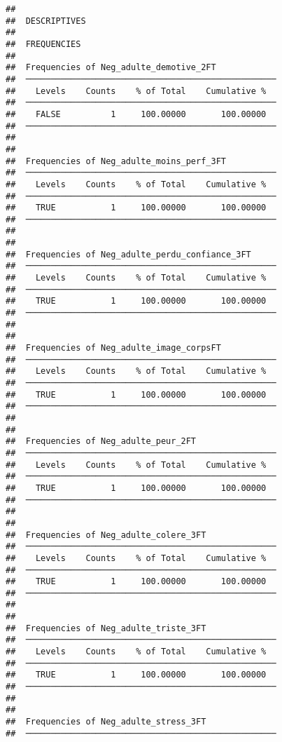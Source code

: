 \documentclass[
]{article}
\begin{document}
\begin{verbatim}
## 
##  DESCRIPTIVES
## 
##  FREQUENCIES
## 
##  Frequencies of Neg_adulte_demotive_2FT             
##  ────────────────────────────────────────────────── 
##    Levels    Counts    % of Total    Cumulative %   
##  ────────────────────────────────────────────────── 
##    FALSE          1     100.00000       100.00000   
##  ────────────────────────────────────────────────── 
## 
## 
##  Frequencies of Neg_adulte_moins_perf_3FT           
##  ────────────────────────────────────────────────── 
##    Levels    Counts    % of Total    Cumulative %   
##  ────────────────────────────────────────────────── 
##    TRUE           1     100.00000       100.00000   
##  ────────────────────────────────────────────────── 
## 
## 
##  Frequencies of Neg_adulte_perdu_confiance_3FT      
##  ────────────────────────────────────────────────── 
##    Levels    Counts    % of Total    Cumulative %   
##  ────────────────────────────────────────────────── 
##    TRUE           1     100.00000       100.00000   
##  ────────────────────────────────────────────────── 
## 
## 
##  Frequencies of Neg_adulte_image_corpsFT            
##  ────────────────────────────────────────────────── 
##    Levels    Counts    % of Total    Cumulative %   
##  ────────────────────────────────────────────────── 
##    TRUE           1     100.00000       100.00000   
##  ────────────────────────────────────────────────── 
## 
## 
##  Frequencies of Neg_adulte_peur_2FT                 
##  ────────────────────────────────────────────────── 
##    Levels    Counts    % of Total    Cumulative %   
##  ────────────────────────────────────────────────── 
##    TRUE           1     100.00000       100.00000   
##  ────────────────────────────────────────────────── 
## 
## 
##  Frequencies of Neg_adulte_colere_3FT               
##  ────────────────────────────────────────────────── 
##    Levels    Counts    % of Total    Cumulative %   
##  ────────────────────────────────────────────────── 
##    TRUE           1     100.00000       100.00000   
##  ────────────────────────────────────────────────── 
## 
## 
##  Frequencies of Neg_adulte_triste_3FT               
##  ────────────────────────────────────────────────── 
##    Levels    Counts    % of Total    Cumulative %   
##  ────────────────────────────────────────────────── 
##    TRUE           1     100.00000       100.00000   
##  ────────────────────────────────────────────────── 
## 
## 
##  Frequencies of Neg_adulte_stress_3FT               
##  ────────────────────────────────────────────────── 

\end{verbatim}
\end{document}
